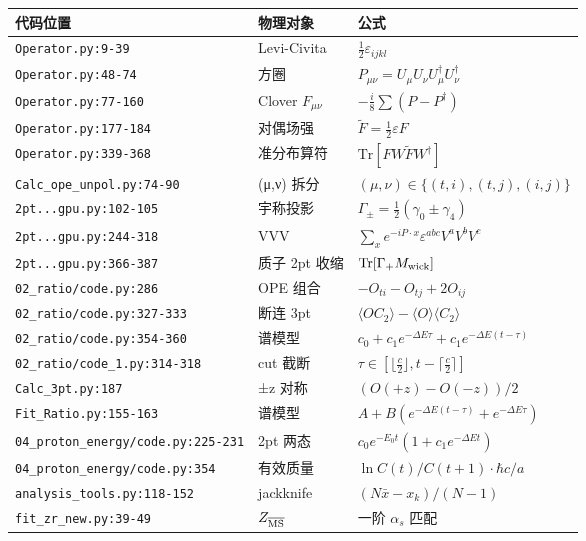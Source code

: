 \documentclass[UTF8]{ctexart}
\begin{document}
\begin{table}[h]
\centering\small
\begin{tabular}{lll}
\toprule
代码位置 & 物理对象 & 公式 \\
\midrule
\texttt{Operator.py:9-39} & Levi-Civita & $\tfrac12\varepsilon_{ijkl}$ \\
\texttt{Operator.py:48-74} & 方圈 & $P_{\mu\nu}=U_\mu U_\nu U_\mu^\dagger U_\nu^\dagger$ \\
\texttt{Operator.py:77-160} & Clover $F_{\mu\nu}$ & $-\frac{i}{8}\sum(P-P^\dagger)$ \\
\texttt{Operator.py:177-184} & 对偶场强 & $\tilde F=\tfrac12\varepsilon F$ \\
\texttt{Operator.py:339-368} & 准分布算符 & $\mathrm{Tr}[F W \tilde F W^\dagger]$ \\
\texttt{Calc\_ope\_unpol.py:74-90} & (μ,ν) 拆分 & $(\mu,\nu)\in\{(t,i),(t,j),(i,j)\}$ \\
\texttt{2pt...gpu.py:102-105} & 宇称投影 & $\Gamma_\pm=\tfrac12(\gamma_0\pm\gamma_4)$ \\
\texttt{2pt...gpu.py:244-318} & VVV & $\sum_x e^{-iP\cdot x}\varepsilon^{abc}V^aV^bV^c$ \\
\texttt{2pt...gpu.py:366-387} & 质子 2pt 收缩 & $\mathrm{Tr}[\Gamma_+ M_{\rm wick}]$ \\
\texttt{02\_ratio/code.py:286} & OPE 组合 & $-O_{ti}-O_{tj}+2O_{ij}$ \\
\texttt{02\_ratio/code.py:327-333} & 断连 3pt & $\langle OC_2\rangle-\langle O\rangle\langle C_2\rangle$ \\
\texttt{02\_ratio/code.py:354-360} & 谱模型 & $c_0+c_1e^{-\Delta E\tau}+c_1e^{-\Delta E(t-\tau)}$ \\
\texttt{02\_ratio/code\_1.py:314-318} & cut 截断 & $\tau\in[\lfloor\frac{c}{2}\rfloor, t-\lceil\frac{c}{2}\rceil]$ \\
\texttt{Calc\_3pt.py:187} & ±z 对称 & $(O(+z)-O(-z))/2$ \\
\texttt{Fit\_Ratio.py:155-163} & 谱模型 & $A+B(e^{-\Delta E(t-\tau)}+e^{-\Delta E\tau})$ \\
\texttt{04\_proton\_energy/code.py:225-231} & 2pt 两态 & $c_0e^{-E_0t}(1+c_1e^{-\Delta E t})$ \\
\texttt{04\_proton\_energy/code.py:354} & 有效质量 & $\ln C(t)/C(t+1)\cdot\hbar c/a$ \\
\texttt{analysis\_tools.py:118-152} & jackknife & $(N\bar x-x_k)/(N-1)$ \\
\texttt{fit\_zr\_new.py:39-49} & $Z_{\overline{\rm MS}}$ & 一阶 $\alpha_s$ 匹配 \\

\end{tabular}
\end{table}
\end{document}
